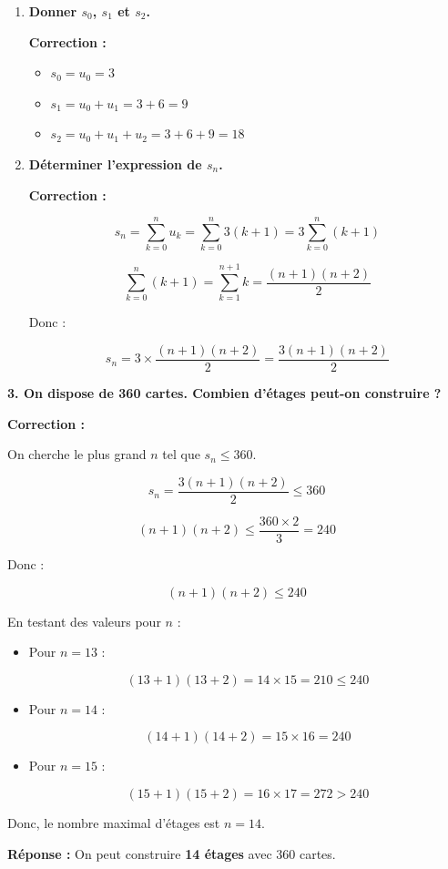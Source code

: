 \documentclass{article}
\begin{document}
\begin{enumerate}[label=\alph*)]

\item \textbf{Donner \( s_0 \), \( s_1 \) et \( s_2 \).}

\textbf{Correction :}

\begin{itemize}
    \item \( s_0 = u_0 = 3 \)
    \item \( s_1 = u_0 + u_1 = 3 + 6 = 9 \)
    \item \( s_2 = u_0 + u_1 + u_2 = 3 + 6 + 9 = 18 \)
\end{itemize}

\bigskip

\item \textbf{Déterminer l'expression de \( s_n \).}

\textbf{Correction :}

\[ s_n = \sum_{k=0}^{n} u_k = \sum_{k=0}^{n} 3(k + 1) = 3 \sum_{k=0}^{n} (k + 1) \]

\[ \sum_{k=0}^{n} (k + 1) = \sum_{k=1}^{n+1} k = \dfrac{(n + 1)(n + 2)}{2} \]

Donc :

\[ s_n = 3 \times \dfrac{(n + 1)(n + 2)}{2} = \dfrac{3(n + 1)(n + 2)}{2} \]

\end{enumerate}

\bigskip

\textbf{3. On dispose de 360 cartes. Combien d'étages peut-on construire ?}

\textbf{Correction :}

On cherche le plus grand \( n \) tel que \( s_n \leq 360 \).

\[ s_n = \dfrac{3(n + 1)(n + 2)}{2} \leq 360 \]

\[ (n + 1)(n + 2) \leq \dfrac{360 \times 2}{3} = 240 \]

Donc :

\[ (n + 1)(n + 2) \leq 240 \]

En testant des valeurs pour \( n \) :

\begin{itemize}
    \item Pour \( n = 13 \) :

    \[ (13 + 1)(13 + 2) = 14 \times 15 = 210 \leq 240 \]

    \item Pour \( n = 14 \) :

    \[ (14 + 1)(14 + 2) = 15 \times 16 = 240 \]

    \item Pour \( n = 15 \) :

    \[ (15 + 1)(15 + 2) = 16 \times 17 = 272 > 240 \]
\end{itemize}

Donc, le nombre maximal d'étages est \( n = 14 \).

\textbf{Réponse :} On peut construire \textbf{14 étages} avec 360 cartes.
\end{document}
